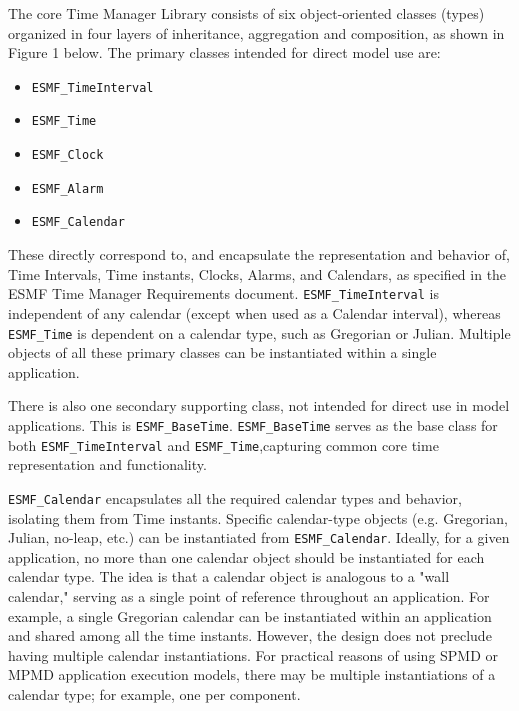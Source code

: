 

The core Time Manager Library consists of six object-oriented classes (types)
organized in four layers of inheritance, aggregation and composition,
as shown in Figure 1 below.  The primary classes intended for
direct model use are:

\begin{itemize}
\item {\tt ESMF\_TimeInterval}
\item {\tt ESMF\_Time}
\item {\tt ESMF\_Clock}
\item {\tt ESMF\_Alarm}
\item {\tt ESMF\_Calendar}
\end{itemize}

These directly correspond to, and encapsulate the representation and
behavior of, Time Intervals, Time instants, Clocks, Alarms, and Calendars,
as specified in the ESMF Time Manager Requirements document.
{\tt ESMF\_TimeInterval} is independent of any calendar (except when used
as a Calendar interval), whereas {\tt ESMF\_Time} is dependent on a calendar
type, such as Gregorian or Julian.  Multiple objects of all these primary
classes can be instantiated within a single application.

There is also one secondary supporting class, not intended for direct
use in model applications.  This is {\tt ESMF\_BaseTime}.  {\tt ESMF\_BaseTime}
serves as the base class for both {\tt ESMF\_TimeInterval} and
{\tt ESMF\_Time},capturing common core time representation and functionality.

{\tt ESMF\_Calendar} encapsulates all the required calendar types and behavior,
isolating them from Time instants.  Specific calendar-type objects (e.g.
Gregorian, Julian, no-leap, etc.) can be instantiated from {\tt ESMF\_Calendar}.
Ideally, for a given application, no more than one calendar
object should be instantiated for each calendar type.  The idea is that
a calendar object is analogous to a "wall calendar," serving as a single
point of reference throughout an application.  For example, a single
Gregorian calendar can be instantiated within an application and shared
among all the time instants.  However, the design does not preclude having
multiple calendar instantiations.  For practical reasons of using SPMD or
MPMD application execution models, there may be multiple instantiations
of a calendar type; for example, one per component.

